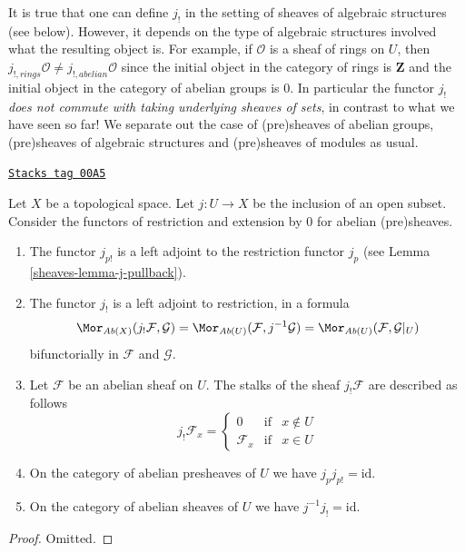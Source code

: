 It is true that one can define $j_!$ in the setting of sheaves
of algebraic structures (see below). However, it depends on the
type of algebraic structures involved what the resulting
object is. For example, if $\mathcal{O}$ is a sheaf of rings
on $U$, then $j_{!, rings}\mathcal{O} \not = j_{!, abelian}\mathcal{O}$
since the initial object in the category of rings
is $\mathbf{Z}$ and the initial object in the category
of abelian groups is $0$. In particular the functor $j_!$
{\it does not commute with taking underlying sheaves of sets},
in contrast to what we have seen so far! We separate out the case
of (pre)sheaves of abelian groups, (pre)sheaves of algebraic structures
and (pre)sheaves of modules as usual.

\begin{lemma}
\label{sheaves-lemma-j-shriek-abelian}
\href{https://stacks.math.columbia.edu/tag/00A5}{\texttt{Stacks tag 00A5}}

Let $X$ be a topological space.
Let $j : U \to X$ be the inclusion of an open subset.
Consider the functors of restriction and extension
by $0$ for abelian (pre)sheaves.
\begin{enumerate}
\item The functor $j_{p!}$ is a left adjoint to the
restriction functor $j_p$ (see Lemma \ref{sheaves-lemma-j-pullback}).
\item The functor $j_!$ is a left adjoint to restriction,
in a formula
$$
\Mor_{\textit{Ab}(X)}(j_!\mathcal{F}, \mathcal{G})
=
\Mor_{\textit{Ab}(U)}(\mathcal{F}, j^{-1}\mathcal{G})
=
\Mor_{\textit{Ab}(U)}(\mathcal{F}, \mathcal{G}|_U)
$$
bifunctorially in $\mathcal{F}$ and $\mathcal{G}$.
\item Let $\mathcal{F}$ be an abelian sheaf on $U$.
The stalks of the sheaf $j_!\mathcal{F}$ are described
as follows
$$
j_{!}\mathcal{F}_x =
\left\{
\begin{matrix}
0 & \text{if} & x \not \in U \\
\mathcal{F}_x & \text{if} & x \in U
\end{matrix}
\right.
$$
\item On the category of abelian presheaves of $U$
we have $j_pj_{p!} = \text{id}$.
\item On the category of abelian sheaves of $U$
we have $j^{-1}j_! = \text{id}$.
\end{enumerate}
\end{lemma}

\begin{proof}
Omitted.
\end{proof}

